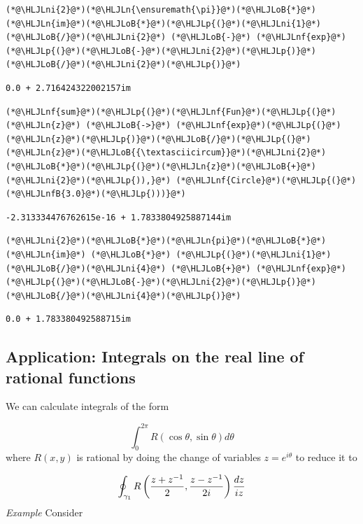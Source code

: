 \documentclass[12pt,a4paper]{article}
\newcommand{\HLJLn}[1]{#1}
\newcommand{\HLJLnf}[1]{\textcolor[RGB]{66,102,213}{#1}}
\newcommand{\HLJLnfB}[1]{\textcolor[RGB]{59,151,46}{#1}}
\newcommand{\HLJLni}[1]{\textcolor[RGB]{59,151,46}{#1}}
\newcommand{\HLJLoB}[1]{\textcolor[RGB]{102,102,102}{\textbf{#1}}}
\newcommand{\HLJLp}[1]{#1}
\begin{document}
\begin{lstlisting}
(*@\HLJLni{2}@*)(*@\HLJLn{\ensuremath{\pi}}@*)(*@\HLJLoB{*}@*)(*@\HLJLn{im}@*)(*@\HLJLoB{*}@*)(*@\HLJLp{(}@*)(*@\HLJLni{1}@*)(*@\HLJLoB{/}@*)(*@\HLJLni{2}@*) (*@\HLJLoB{-}@*) (*@\HLJLnf{exp}@*)(*@\HLJLp{(}@*)(*@\HLJLoB{-}@*)(*@\HLJLni{2}@*)(*@\HLJLp{)}@*)(*@\HLJLoB{/}@*)(*@\HLJLni{2}@*)(*@\HLJLp{)}@*)
\end{lstlisting}

\begin{lstlisting}
0.0 + 2.716424322002157im
\end{lstlisting}


\begin{lstlisting}
(*@\HLJLnf{sum}@*)(*@\HLJLp{(}@*)(*@\HLJLnf{Fun}@*)(*@\HLJLp{(}@*)(*@\HLJLn{z}@*) (*@\HLJLoB{->}@*) (*@\HLJLnf{exp}@*)(*@\HLJLp{(}@*)(*@\HLJLn{z}@*)(*@\HLJLp{)}@*)(*@\HLJLoB{/}@*)(*@\HLJLp{(}@*)(*@\HLJLn{z}@*)(*@\HLJLoB{{\textasciicircum}}@*)(*@\HLJLni{2}@*)(*@\HLJLoB{*}@*)(*@\HLJLp{(}@*)(*@\HLJLn{z}@*)(*@\HLJLoB{+}@*)(*@\HLJLni{2}@*)(*@\HLJLp{)),}@*) (*@\HLJLnf{Circle}@*)(*@\HLJLp{(}@*)(*@\HLJLnfB{3.0}@*)(*@\HLJLp{)))}@*)
\end{lstlisting}

\begin{lstlisting}
-2.313334476762615e-16 + 1.7833804925887144im
\end{lstlisting}


\begin{lstlisting}
(*@\HLJLni{2}@*)(*@\HLJLoB{*}@*)(*@\HLJLn{pi}@*)(*@\HLJLoB{*}@*)(*@\HLJLn{im}@*) (*@\HLJLoB{*}@*) (*@\HLJLp{(}@*)(*@\HLJLni{1}@*)(*@\HLJLoB{/}@*)(*@\HLJLni{4}@*) (*@\HLJLoB{+}@*) (*@\HLJLnf{exp}@*)(*@\HLJLp{(}@*)(*@\HLJLoB{-}@*)(*@\HLJLni{2}@*)(*@\HLJLp{)}@*)(*@\HLJLoB{/}@*)(*@\HLJLni{4}@*)(*@\HLJLp{)}@*)
\end{lstlisting}

\begin{lstlisting}
0.0 + 1.783380492588715im
\end{lstlisting}


\subsection{Application: Integrals on the real line of rational functions}
We can calculate integrals of the form 

\[
\int_0^{2 \pi} R(\cos \theta, \sin \theta) d \theta
\]
where $R(x,y)$ is rational by doing the change of variables $z = e^{i \theta}$ to reduce it to

\[
\oint_{\gamma_1} R\left({z + z^{-1} \over 2}, {z - z^{-1} \over 2 i} \right) {d z \over i z}
\]
\emph{Example} Consider
\end{document}

